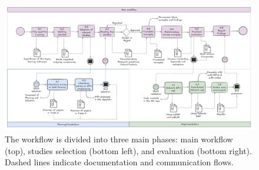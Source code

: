 \begin{figure}[th]
	\centering
	\includegraphics[width=\linewidth]{figures/workflow2}
	\caption{The workflow is divided into three main phases: main workflow (top), studies selection (bottom left), and
		evaluation (bottom right). Dashed lines indicate documentation and communication flows.}
	\label{fig:workflow}
\end{figure}





